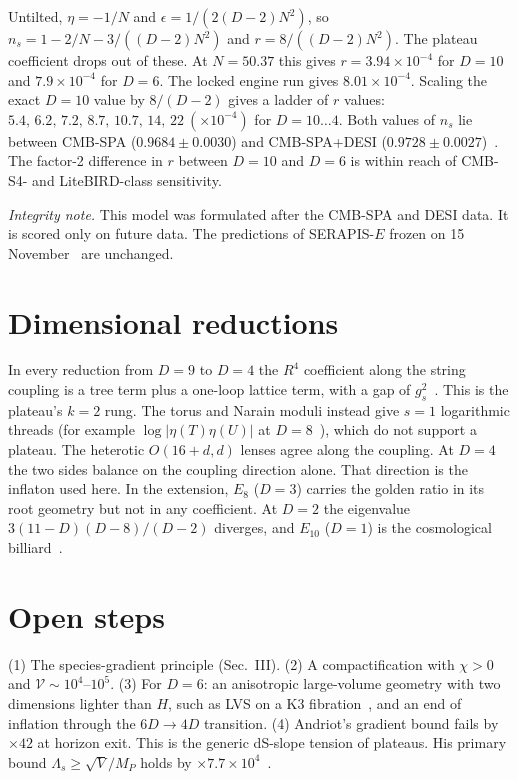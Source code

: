 \documentclass[aps,prd,twocolumn,superscriptaddress,nofootinbib,showkeys]{revtex4-2}
\begin{document}
Untilted, $\eta=-1/N$ and $\epsilon=1/(2(D-2)N^2)$, so $n_s=1-2/N-3/((D-2)N^2)$ and $r=8/((D-2)N^2)$. The plateau coefficient drops out of these. At $N=50.37$ this gives $r=3.94\times10^{-4}$ for $D=10$ and $7.9\times10^{-4}$ for $D=6$. The locked engine run gives $8.01\times10^{-4}$. Scaling the exact $D=10$ value by $8/(D-2)$ gives a ladder of $r$ values: $5.4,\,6.2,\,7.2,\,8.7,\,10.7,\,14,\,22\ (\times10^{-4})$ for $D=10\dots4$. Both values of $n_s$ lie between CMB-SPA ($0.9684\pm0.0030$) and CMB-SPA+DESI ($0.9728\pm0.0027$)~\cite{SPA}. The factor-2 difference in $r$ between $D=10$ and $D=6$ is within reach of CMB-S4- and LiteBIRD-class sensitivity.

\emph{Integrity note.} This model was formulated after the CMB-SPA and DESI data. It is scored only on future data. The predictions of SERAPIS-$E$ frozen on 15 November~\cite{P3} are unchanged.

\section{Dimensional reductions}
In every reduction from $D=9$ to $D=4$ the $R^4$ coefficient along the string coupling is a tree term plus a one-loop lattice term, with a gap of $g_s^2$~\cite{GRV,KOP,OP}. This is the plateau's $k=2$ rung. The torus and Narain moduli instead give $s=1$ logarithmic threads (for example $\log|\eta(T)\eta(U)|$ at $D=8$~\cite{FS}), which do not support a plateau. The heterotic $O(16+d,d)$ lenses agree along the coupling. At $D=4$ the two sides balance on the coupling direction alone. That direction is the inflaton used here. In the extension, $E_8$ ($D=3$) carries the golden ratio in its root geometry but not in any coefficient. At $D=2$ the eigenvalue $3(11-D)(D-8)/(D-2)$ diverges, and $E_{10}$ ($D=1$) is the cosmological billiard~\cite{FK}.

\section{Open steps}
(1) The species-gradient principle (Sec.~III). (2) A compactification with $\chi>0$ and $\mathcal V\sim10^4$--$10^5$. (3) For $D=6$: an anisotropic large-volume geometry with two dimensions lighter than $H$, such as LVS on a K3 fibration~\cite{ADD}, and an end of inflation through the $6D\to4D$ transition. (4) Andriot's gradient bound fails by $\times42$ at horizon exit. This is the generic dS-slope tension of plateaus. His primary bound $\Lambda_s\ge\sqrt V/M_P$ holds by $\times7.7\times10^4$~\cite{And}.
\end{document}
